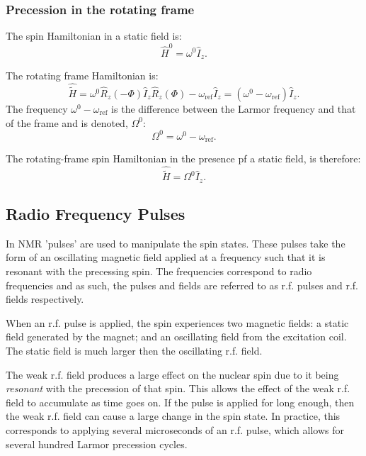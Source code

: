 \subsubsection{Precession in the rotating frame}
The spin Hamiltonian in a static field is:
\begin{equation}
  \hat{H}^0 = \omega^0\hat{I}_z.
\end{equation}

The rotating frame Hamiltonian is:
\begin{equation}
  \hat{\tilde{H}} = \omega^0\hat{R}_z(-\Phi)\hat{I}_z\hat{R}_z(\Phi) - \omega_\text{ref}\hat{I}_z =
  (\omega^0 - \omega_\text{ref})\hat{I}_z.
\end{equation}
The frequency $\omega^0 - \omega_\text{ref}$ is the difference between the Larmor frequency
and that of the frame and is denoted, $\Omega^0$:
\begin{equation}
  \Omega^0 = \omega^0 - \omega_\text{ref}.
\end{equation}

The rotating-frame spin Hamiltonian in the presence pf a static field, is therefore:
\begin{equation}
  \hat{\tilde{H}} = \Omega^0\hat{I}_z.
\end{equation}

\subsection{Radio Frequency Pulses}

In NMR 'pulses' are used to manipulate the spin states. These pulses take the form
of an oscillating magnetic field applied at a frequency such that it is resonant with
the precessing spin. The frequencies correspond to radio frequencies and as such, the pulses and
fields are referred to as r.f. pulses and r.f. fields respectively.

When an r.f. pulse is applied, the spin experiences two magnetic fields: a static field generated
by the magnet; and an oscillating field from the excitation coil. The static field is much larger
then the oscillating r.f. field.

The weak r.f. field produces a large effect on the nuclear spin due to it being \textit{resonant}
with the precession of that spin. This allows the effect of the weak r.f. field to accumulate
as time goes on. If the pulse is applied for long enough, then the weak r.f. field can cause a
large change in the spin state. In practice, this corresponds to applying several microseconds
of an r.f. pulse, which allows for several hundred Larmor precession cycles.

